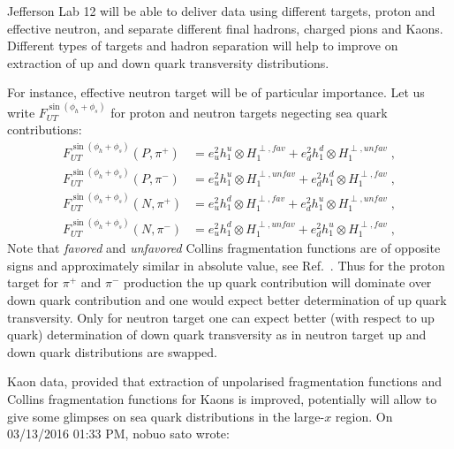\documentclass[twocolumn,showpacs,preprintnumbers,amsmath,amssymb,floatfix,prd]{revtex4}
\begin{document}
Jefferson Lab 12 will be able to deliver data using different targets, proton and effective neutron, and separate different final hadrons, charged pions and Kaons. Different types of targets and hadron separation will help to improve on extraction of up and down quark transversity distributions.

For instance, effective neutron target will be of particular importance. Let us write
$F_{UT}^{\sin\left(\phi_h +\phi_s\right)}$ for proton and neutron targets negecting sea quark contributions:
\begin{align}
F_{UT}^{\sin\left(\phi_h +\phi_s\right)}(P,\pi^+) &= e_u^2 h_1^{u} \otimes H_1^{\perp, fav} +
e_d^2 h_1^{d} \otimes H_1^{\perp, unfav}\; , \\
F_{UT}^{\sin\left(\phi_h +\phi_s\right)}(P,\pi^-) &= e_u^2 h_1^{u} \otimes H_1^{\perp, unfav} +
e_d^2 h_1^{d} \otimes H_1^{\perp, fav}\; ,\\
F_{UT}^{\sin\left(\phi_h +\phi_s\right)}(N,\pi^+) &= e_u^2 h_1^{d} \otimes H_1^{\perp, fav} +
e_d^2 h_1^{u} \otimes H_1^{\perp, unfav}\; ,\\
F_{UT}^{\sin\left(\phi_h +\phi_s\right)}(N,\pi^-) &= e_u^2 h_1^{d} \otimes H_1^{\perp, unfav} +
e_d^2 h_1^{u} \otimes H_1^{\perp, fav}\; ,
\end{align}
Note that {\em favored} and  {\em unfavored} Collins fragmentation functions are of opposite signs and approximately similar in absolute value, see Ref.~\cite{Kang:2015msa,Anselmino:2013vqa}. Thus for the proton target for $\pi^+$ and $\pi^-$ production the up quark contribution will dominate over down quark contribution and one would expect better determination of up quark transversity.
Only for neutron target one can expect better (with respect to up quark) determination of down quark transversity as in neutron target up and down quark distributions are swapped.

Kaon data, provided that extraction of unpolarised fragmentation functions and Collins fragmentation functions for Kaons is improved, potentially will allow to give some glimpses on sea quark distributions in the large-$x$ region.
On 03/13/2016 01:33 PM, nobuo sato wrote:


\end{document}

